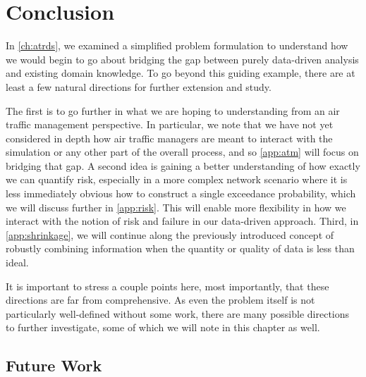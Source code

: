 \chapter{Conclusion}
\label{ch:conclusion}


In \cref{ch:atrds}, we examined a simplified problem formulation to understand how we would begin to go about bridging the gap between purely data-driven analysis and existing domain knowledge. To go beyond this guiding example, there are at least a few natural directions for further extension and study.

The first is to go further in what we are hoping to understanding from an air traffic management perspective. In particular, we note that we have not yet considered in depth how air traffic managers are meant to interact with the simulation or any other part of the overall process, and so \cref{app:atm} will focus on bridging that gap. A second idea is gaining a better understanding of how exactly we can quantify risk, especially in a more complex network scenario where it is less immediately obvious how to construct a single exceedance probability, which we will discuss further in \cref{app:risk}. This will enable more flexibility in how we interact with the notion of risk and failure in our data-driven approach. Third, in \cref{app:shrinkage}, we will continue along the previously introduced concept of robustly combining information when the quantity or quality of data is less than ideal. 

It is important to stress a couple points here, most importantly, that these directions are far from comprehensive. As even the problem itself is not particularly well-defined without some work, there are many possible directions to further investigate, some of which we will note in this chapter as well.


\section{Future Work}

